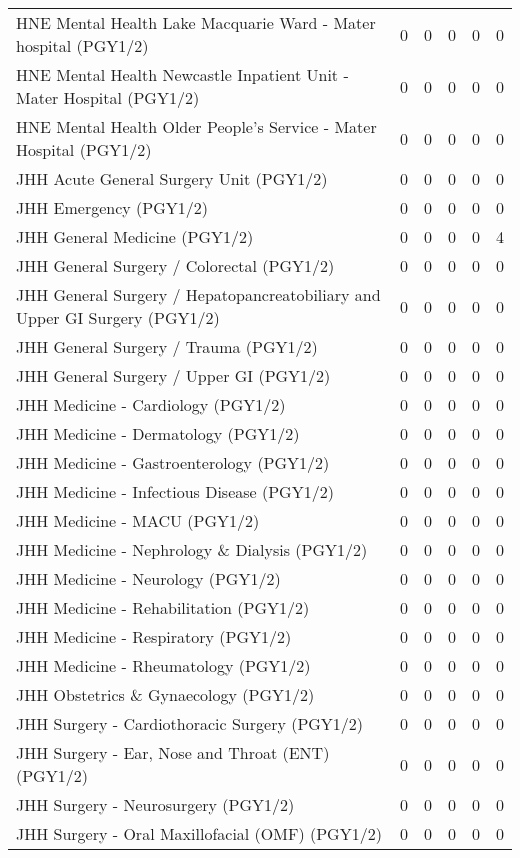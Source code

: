 \documentclass[
]{article}
\begin{document}
\begin{longtable}{lrrrrr}
HNE Mental Health Lake Macquarie Ward - Mater hospital (PGY1/2) & 0 & 0 & 0 & 0 & 0 \\ 
HNE Mental Health Newcastle Inpatient Unit - Mater Hospital (PGY1/2) & 0 & 0 & 0 & 0 & 0 \\ 
HNE Mental Health Older People's Service - Mater Hospital (PGY1/2) & 0 & 0 & 0 & 0 & 0 \\ 
JHH Acute General Surgery Unit (PGY1/2) & 0 & 0 & 0 & 0 & 0 \\ 
JHH Emergency (PGY1/2) & 0 & 0 & 0 & 0 & 0 \\ 
JHH General Medicine (PGY1/2) & 0 & 0 & 0 & 0 & 4 \\ 
JHH General Surgery / Colorectal (PGY1/2) & 0 & 0 & 0 & 0 & 0 \\ 
JHH General Surgery / Hepatopancreatobiliary and Upper GI Surgery (PGY1/2) & 0 & 0 & 0 & 0 & 0 \\ 
JHH General Surgery / Trauma (PGY1/2) & 0 & 0 & 0 & 0 & 0 \\ 
JHH General Surgery / Upper GI (PGY1/2) & 0 & 0 & 0 & 0 & 0 \\ 
JHH Medicine - Cardiology (PGY1/2) & 0 & 0 & 0 & 0 & 0 \\ 
JHH Medicine - Dermatology (PGY1/2) & 0 & 0 & 0 & 0 & 0 \\ 
JHH Medicine - Gastroenterology (PGY1/2) & 0 & 0 & 0 & 0 & 0 \\ 
JHH Medicine - Infectious Disease (PGY1/2) & 0 & 0 & 0 & 0 & 0 \\ 
JHH Medicine - MACU (PGY1/2) & 0 & 0 & 0 & 0 & 0 \\ 
JHH Medicine - Nephrology \& Dialysis (PGY1/2) & 0 & 0 & 0 & 0 & 0 \\ 
JHH Medicine - Neurology (PGY1/2) & 0 & 0 & 0 & 0 & 0 \\ 
JHH Medicine - Rehabilitation (PGY1/2) & 0 & 0 & 0 & 0 & 0 \\ 
JHH Medicine - Respiratory (PGY1/2) & 0 & 0 & 0 & 0 & 0 \\ 
JHH Medicine - Rheumatology (PGY1/2) & 0 & 0 & 0 & 0 & 0 \\ 
JHH Obstetrics \& Gynaecology (PGY1/2) & 0 & 0 & 0 & 0 & 0 \\ 
JHH Surgery - Cardiothoracic Surgery (PGY1/2) & 0 & 0 & 0 & 0 & 0 \\ 
JHH Surgery - Ear, Nose and Throat (ENT) (PGY1/2) & 0 & 0 & 0 & 0 & 0 \\ 
JHH Surgery - Neurosurgery (PGY1/2) & 0 & 0 & 0 & 0 & 0 \\ 
JHH Surgery - Oral Maxillofacial (OMF) (PGY1/2) & 0 & 0 & 0 & 0 & 0 \\ 

\end{longtable}
\end{document}
